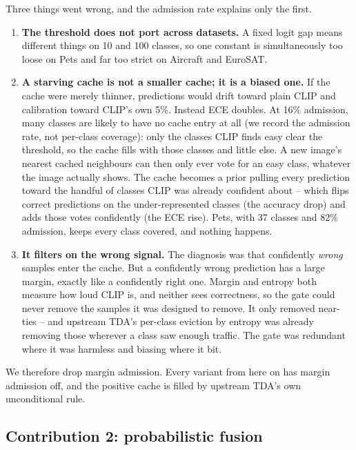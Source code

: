Three things went wrong, and the admission rate explains only the first.

\begin{enumerate}
    \item \textbf{The threshold does not port across datasets.} A fixed logit gap means
        different things on 10 and 100 classes, so one constant is simultaneously too loose
        on Pets and far too strict on Aircraft and EuroSAT.
    \item \textbf{A starving cache is not a smaller cache; it is a biased one.} If the cache
        were merely thinner, predictions would drift toward plain CLIP and calibration toward
        CLIP's own 5\%. Instead ECE doubles. At 16\% admission, many classes are likely to
        have no cache entry at all (we record the admission rate, not per-class coverage):
        only the classes CLIP finds easy clear the threshold, so the cache fills with those
        classes and little else. A new image's nearest cached neighbours can then
        only ever vote for an easy class, whatever the image actually shows. The cache becomes
        a prior pulling every prediction toward the handful of classes CLIP was already
        confident about -- which flips correct predictions on the under-represented classes
        (the accuracy drop) and adds those votes confidently (the ECE rise). Pets, with 37
        classes and 82\% admission, keeps every class covered, and nothing happens.
    \item \textbf{It filters on the wrong signal.} The diagnosis was that confidently
        \emph{wrong} samples enter the cache. But a confidently wrong prediction has a large
        margin, exactly like a confidently right one. Margin and entropy both measure how loud
        CLIP is, and neither sees correctness, so the gate could never remove the samples it
        was designed to remove. It only removed near-ties -- and upstream TDA's per-class
        eviction by entropy was already removing those wherever a class saw enough traffic.
        The gate was redundant where it was harmless and biasing where it bit.
\end{enumerate}

We therefore drop margin admission. Every variant from here on has margin admission off, and
the positive cache is filled by upstream TDA's own unconditional rule.

\subsection{Contribution 2: probabilistic fusion}
\label{sec:fusion}


